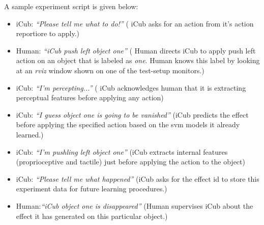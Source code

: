 \documentclass[runningheads,a4paper]{llncs}
\begin{document}
A sample experiment script is given below:
\begin{itemize}
\item iCub: \emph{``Please tell me what to do!''} ( iCub asks for an action from it's action reportiore to apply.)
\item Human: \emph{``iCub push left object one''}  ( Human directs iCub to apply push left action on an object that is labeled as \emph{one}. Human knows this label by looking at an \emph{rviz} window shown on one of the test-setup monitors.)
\item iCub: \emph{``I'm percepting...''} ( iCub acknowledges human that it is extracting perceptual features before applying any action)
\item iCub: \emph{``I guess object one is going to be vanished''} (iCub predicts the effect before applying the specified action based on the svm models it already learned.)
\item iCub: \emph{``I'm pushling left object one''} (iCub extracts internal features (proprioceptive and tactile) just before applying the action to the object)
\item iCub: \emph{``Please tell me what happened''} (iCub asks for the effect id to store this experiment data for future learning procedures.)
\item Human:\emph{``iCub object one is disappeared''} (Human supervises iCub about the effect it has generated on this particular object.)
\end{itemize}
\end{document}
